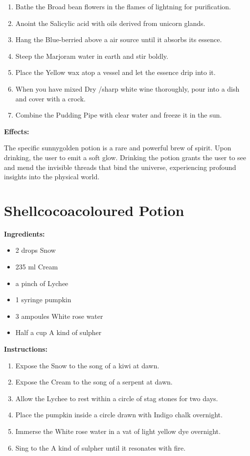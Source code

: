 \documentclass{article}
\begin{document}
\begin{enumerate}
  \item Bathe the Broad bean flowers in the flames of lightning for purification.
  \item Anoint the Salicylic acid with oils derived from unicorn glands.
  \item Hang the Blue-berried above a air source until it absorbs its essence.
  \item Steep the Marjoram water in earth and stir boldly.
  \item Place the Yellow wax atop a vessel and let the essence drip into it.
  \item When you have mixed Dry /sharp white wine thoroughly, pour into a dish and cover with a crock.
  \item Combine the Pudding Pipe with clear water and freeze it in the sun.
\end{enumerate}

\textbf{Effects:}

The specific sunnygolden potion is a rare and powerful brew of spirit. Upon drinking, the user to emit a soft glow. Drinking the potion grants the user to see and mend the invisible threads that bind the universe, experiencing profound insights into the physical world.

\newpage
\section*{Shellcocoacoloured Potion}

\textbf{Ingredients:}

\begin{itemize}
  \item 2 drops Snow
  \item 235 ml Cream
  \item a pinch of Lychee
  \item 1 syringe pumpkin
  \item 3 ampoules White rose water
  \item Half a cup A kind of sulpher
\end{itemize}

\textbf{Instructions:}

\begin{enumerate}
  \item Expose the Snow to the song of a kiwi at dawn.
  \item Expose the Cream to the song of a serpent at dawn.
  \item Allow the Lychee to rest within a circle of stag stones for two days.
  \item Place the pumpkin inside a circle drawn with Indigo chalk overnight.
  \item Immerse the White rose water in a vat of light yellow dye overnight.
  \item Sing to the A kind of sulpher until it resonates with fire.
\end{enumerate}
\end{document}
